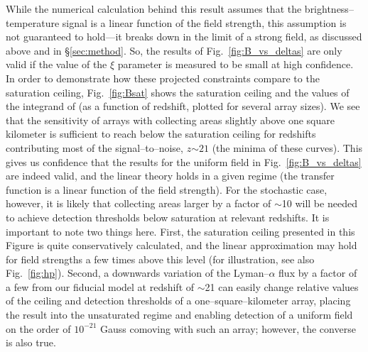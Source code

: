 While the numerical calculation behind this result assumes that the brightness--temperature signal is a linear function of the field strength, this assumption is not guaranteed to hold---it breaks down in the limit of a strong field, as discussed above and in \S\ref{sec:method}. So, the results of Fig.~\ref{fig:B_vs_deltas} are only valid if the value of the $\xi$ parameter is measured to be small at high confidence. In order to demonstrate how these projected constraints compare to the saturation ceiling, Fig.~\ref{fig:Bsat} shows the saturation ceiling and the values of the integrand of \eq{\ref{eq:fisher_patch}} (as a function of redshift, plotted for several array sizes). We see that the sensitivity of arrays with collecting areas slightly above one square kilometer is sufficient to reach below the saturation ceiling for redshifts contributing most of the signal--to--noise, $z$$\sim$$21$ (the minima of these curves). This gives us confidence that the results for the uniform field in Fig.~\ref{fig:B_vs_deltas} are indeed valid, and the linear theory holds in a given regime (the transfer function is a linear function of the field strength). For the stochastic case, however, it is likely that collecting areas larger by a factor of $\sim$10 will be needed to achieve detection thresholds below saturation at relevant redshifts. It is important to note two things here. First, the saturation ceiling presented in this Figure is quite conservatively calculated, and the linear approximation may hold for field strengths a few times above this level (for illustration, see also Fig.~\ref{fig:hp}). Second, a downwards variation of the Lyman--$\alpha$ flux by a factor of a few from our fiducial model at redshift of $\sim$21 can easily change relative values of the ceiling and detection thresholds of a one--square--kilometer array, placing the result into the unsaturated regime and enabling detection of a uniform field on the order of $10^{-21}$ Gauss comoving with such an array; however, the converse is also true. 
